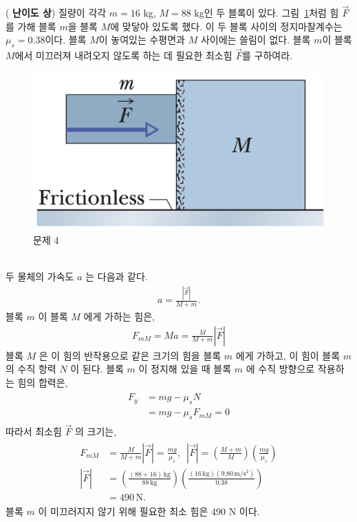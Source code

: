 \documentclass[floatfix,nofootinbib,superscriptaddress,fleqn,preprint]{revtex4}
\begin{document}
\vspace{2cm}

 (\textbf{\color{red} 난이도 상})
질량이 각각 $m=16$ kg, $M=88$ kg인 두 블록이 
있다. 그림~\ref{fig:4}처럼 힘 $\vec{F}$를 가해 블록 $m$을 블록 $M$에
맞닿아 있도록 했다. 이 두 블록 사이의 정지마찰계수는
$\mu_s=0.38$이다. 블록 $M$이 놓여있는 수평면과 $M$ 사이에는 쓸림이
없다.  블록 $m$이 블록 $M$에서 미끄러져 내려오지 않도록 하는 데 필요한
최소힘 $\vec{F}$를 구하여라. 
\begin{figure}[ht]
  \centering
\includegraphics[scale=0.3]{Qfig6-4-20220321.png}  
  \caption{문제 4}
  \label{fig:4}
\end{figure}\\

두 물체의 가속도 $a$ 는 다음과 같다.
\begin{align}
  a = \frac{|\vec{F}|}{M+m}.
\end{align}
 블록 $m$ 이 블록 $M$ 에게 가하는 힘은,
 \begin{align}
   F_{mM} = Ma = \frac{M}{M+m}|\vec{F}|
 \end{align} 
 블록 $M$ 은 이 힘의 반작용으로 같은 크기의 힘을 블록 $m$ 에게 가하고, 
 이 힘이 블록 $m$ 의 수직 항력 $N$ 이 된다. 블록 $m$ 이 정지해 있을 때 
 블록 $m$ 에 수직 방향으로 작용하는 힘의 합력은,
 \begin{align}
  \begin{split}
    F_y &= mg - \mu_sN \\
    &= mg - \mu_s F_{mM} = 0
  \end{split}
 \end{align}
 따라서 최소힘 $\vec{F}$ 의 크기는,
 \begin{align}
   \begin{split}
     F_{mM} &= \frac{M}{M+m}|\vec{F}| =\frac{mg}{\mu_s},\,\,\,
     |\vec{F}| = \left(\frac{M+m}{M}\right)\left(\frac{mg}{\mu_s}\right)  \\
     |\vec{F}| &= \left(\frac{(88+16)\,\mathrm{kg}}{88\,\mathrm{kg}}\right)
     \left(\frac{(16\,\mathrm{kg})(9.80\,\mathrm{m/s^2})}{0.38}\right)  \\
     &= 490\,\mathrm{N}.
   \end{split}
 \end{align}
 블록 $m$ 이 미끄러지지 않기 위해 필요한 최소 힘은 490 N 이다.
\end{document}
